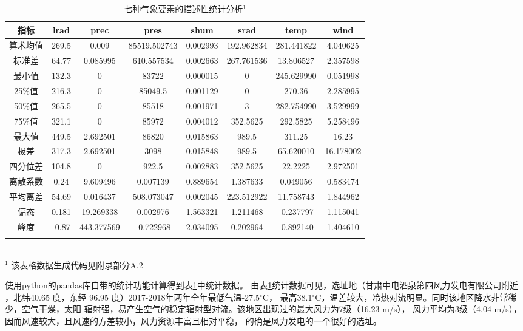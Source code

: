 \documentclass[AutoFakeBold]{LZUThesis}
\begin{document}
\begin{table}[H]
    \centering
    \caption{七种气象要素的描述性统计分析$^1$}
    \begin{tabular}{cccccccc}
    \toprule
    指标 & lrad & prec & pres & shum & srad & temp & wind \\
    \midrule
    算术均值 & 269.5 & 0.009 & 85519.502743 & 0.002993 & 192.962834 & 281.441822 & 4.040625 \\
    标准差 & 64.77 & 0.085995 & 610.557534 & 0.002663 & 267.761536 & 13.806527 & 2.357598 \\
    最小值 & 132.3 & 0 & 83722 & 0.000015 & 0 & 245.629990 & 0.051998 \\
    25\%值 & 216.3 & 0 & 85049.5 & 0.001129 & 0 & 270.36 & 2.285995 \\
    50\%值 & 265.5 & 0 & 85518 & 0.001971 & 3 & 282.754990 & 3.529999 \\
    75\%值 & 321.1 & 0 & 85972 & 0.004012 & 352.5625 & 292.5825 & 5.258496 \\
    最大值 & 449.5 & 2.692501 & 86820 & 0.015863 & 989.5 & 311.25 & 16.23 \\
    极差 & 317.3 & 2.692501 & 3098 & 0.015848 & 989.5 & 65.620010 & 16.178002 \\
    四分位差 & 104.8 & 0 & 922.5 & 0.002883 & 352.5625 & 22.2225 & 2.972501 \\
    离散系数 & 0.24 & 9.609496 & 0.007139 & 0.889654 & 1.387633 & 0.049056 & 0.583474 \\
    平均离差 & 54.69 & 0.016437 & 508.073047 & 0.002045 & 223.512922 & 11.758743 & 1.844962 \\
    偏态 & 0.181 & 19.269338 & 0.002976 & 1.563321 & 1.211468 & -0.237797 & 1.115041 \\
    峰度 & -0.87 & 443.377569 & -0.722968 & 2.034095 & 0.202964 & -0.892140 & 1.404610 \\
    \bottomrule \\
    \end{tabular} \\
    \footnotesize{$^1$ 该表格数据生成代码见附录部分A.2} \\
    \label{analysis}
\end{table}

使用python的pandas库自带的统计功能计算得到表\ref{analysis}中统计数据。
由表\ref{analysis}统计数据可见，选址地（甘肃中电酒泉第四风力发电有限公司附近
，北纬40.65 度，东经 96.95 度）2017-2018年两年全年最低气温-27.5$^{\circ}$C，
最高38.1$^{\circ}$C，温差较大，冷热对流明显。同时该地区降水非常稀少，空气干燥，太阳
辐射强，易产生空气的稳定辐射型对流。该地区出现过的最大风力为7级（16.23 m/s），
风力平均为3级（4.04 m/s），因而风速较大，且风速的方差较小，风力资源丰富且相对平稳，
的确是风力发电的一个很好的选址。
\end{document}
